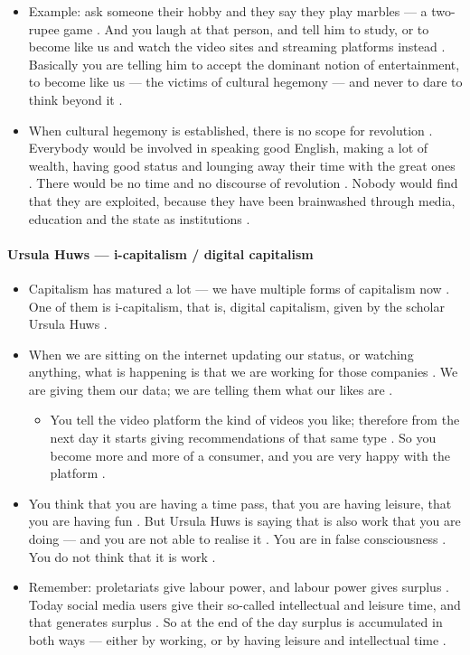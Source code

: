 \begin{itemize}
    \item Example: ask someone their hobby and they say they play marbles --- a two-rupee game . And you laugh at that person, and tell him to study, or to become like us and watch the video sites and streaming platforms instead . Basically you are telling him to accept the dominant notion of entertainment, to become like us --- the victims of cultural hegemony --- and never to dare to think beyond it .
    \item When cultural hegemony is established, there is no scope for revolution . Everybody would be involved in speaking good English, making a lot of wealth, having good status and lounging away their time with the great ones . There would be no time and no discourse of revolution . Nobody would find that they are exploited, because they have been brainwashed through media, education and the state as institutions .
\end{itemize}

\paragraph{Ursula Huws --- i-capitalism / digital capitalism}
\begin{itemize}
    \item Capitalism has matured a lot --- we have multiple forms of capitalism now . One of them is i-capitalism, that is, digital capitalism, given by the scholar Ursula Huws .
    \item When we are sitting on the internet updating our status, or watching anything, what is happening is that we are working for those companies . We are giving them our data; we are telling them what our likes are .
    \begin{itemize}
        \item You tell the video platform the kind of videos you like; therefore from the next day it starts giving recommendations of that same type . So you become more and more of a consumer, and you are very happy with the platform .
    \end{itemize}
    \item You think that you are having a time pass, that you are having leisure, that you are having fun . But Ursula Huws is saying that is also work that you are doing --- and you are not able to realise it . You are in false consciousness . You do not think that it is work .
    \item Remember: proletariats give labour power, and labour power gives surplus . Today social media users give their so-called intellectual and leisure time, and that generates surplus . So at the end of the day surplus is accumulated in both ways --- either by working, or by having leisure and intellectual time .
\end{itemize}

